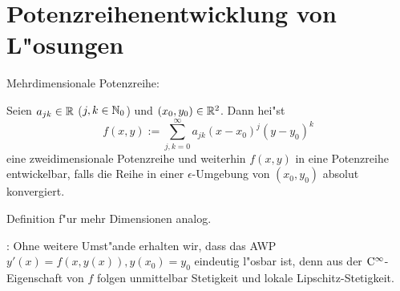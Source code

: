 \section{Potenzreihenentwicklung von L"osungen}
 Mehrdimensionale Potenzreihe:{
  Seien $a_{jk}\in\mathbb R$ ($j,k\in\mathbb N_0$) und $(x_0,y_0)\in\mathbb R^2$. Dann hei"st
  \[f(x,y):=\sum_{j,k=0}^\infty a_{jk}(x-x_0)^j(y-y_0)^k
    \]
  eine zweidimensionale Potenzreihe und weiterhin $f(x,y)$ in eine Potenzreihe
  entwickelbar, falls die Reihe in einer $\epsilon$-Umgebung von $(x_0,y_0)$
  absolut konvergiert.
  
  Definition f"ur mehr Dimensionen analog.
  }
\remark:{
  Ohne weitere Umst"ande erhalten wir, dass das AWP 
  $y'(x)=f(x,y(x)),y(x_0)=y_0$ eindeutig l"osbar ist, denn
  aus der ${\rm C}^\infty$-Eigenschaft von $f$ folgen unmittelbar 
  Stetigkeit und lokale Lipschitz-Stetigkeit.
  }

